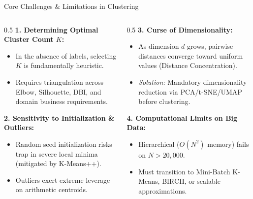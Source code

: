 \documentclass[aspectratio=169,10pt]{beamer}
\begin{document}
\begin{frame}{Core Challenges \& Limitations in Clustering}
  \small
  \begin{columns}[T]
    \begin{column}{0.5\textwidth}
      \textbf{1. Determining Optimal Cluster Count $K$:}
      \begin{itemize}\setlength{\itemsep}{2pt}
        \item In the absence of labels, selecting $K$ is fundamentally heuristic.
        \item Requires triangulation across Elbow, Silhouette, DBI, and domain business requirements.
      \end{itemize}
      \vspace{0.4em}
      \textbf{2. Sensitivity to Initialization \& Outliers:}
      \begin{itemize}\setlength{\itemsep}{2pt}
        \item Random seed initialization risks trap in severe local minima (mitigated by K-Means++).
        \item Outliers exert extreme leverage on arithmetic centroids.
      \end{itemize}
    \end{column}
    \begin{column}{0.5\textwidth}
      \textbf{3. Curse of Dimensionality:}
      \begin{itemize}\setlength{\itemsep}{2pt}
        \item As dimension $d$ grows, pairwise distances converge toward uniform values (Distance Concentration).
        \item \textit{Solution:} Mandatory dimensionality reduction via PCA/t-SNE/UMAP before clustering.
      \end{itemize}
      \vspace{0.4em}
      \textbf{4. Computational Limits on Big Data:}
      \begin{itemize}\setlength{\itemsep}{2pt}
        \item Hierarchical ($O(N^2)$ memory) fails on $N > 20{,}000$.
        \item Must transition to Mini-Batch K-Means, BIRCH, or scalable approximations.
      \end{itemize}
    \end{column}
  \end{columns}
\end{frame}
\end{document}
